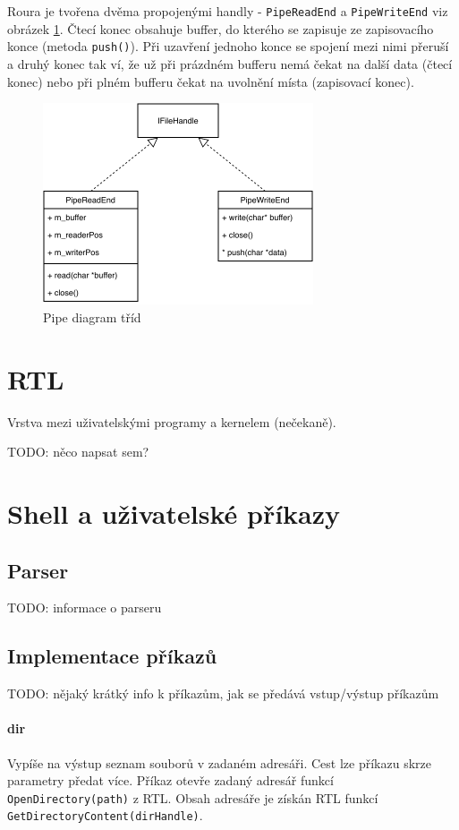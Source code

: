\documentclass[11pt,a4paper]{scrartcl}
\begin{document}
	Roura je tvořena dvěma propojenými handly - \verb|PipeReadEnd| a \verb|PipeWriteEnd| viz obrázek \ref{fig:pipe-c}. Čtecí konec obsahuje buffer, do kterého se zapisuje ze zapisovacího konce (metoda \verb|push()|). Při uzavření jednoho konce se spojení mezi nimi přeruší a druhý konec tak ví, že už při prázdném bufferu nemá čekat na další data (čtecí konec) nebo při plném bufferu čekat na uvolnění místa (zapisovací konec).
	
	\begin{figure}[H]
		\centering
		\includegraphics[width=8cm]{pipe-c.pdf}
		\caption{Pipe diagram tříd}
		\label{fig:pipe-c}
	\end{figure}
	
	\section{RTL}
	Vrstva mezi uživatelskými programy a kernelem (nečekaně).
	
	TODO: něco napsat sem?
	
	\section{Shell a uživatelské příkazy}
	
	\subsection{Parser}
	TODO: informace o parseru
	
	\subsection{Implementace příkazů}
	TODO: nějaký krátký info k příkazům, jak se předává vstup/výstup příkazům
	
	\paragraph{dir}
	Vypíše na výstup seznam souborů v zadaném adresáři. Cest lze příkazu skrze parametry předat více. Příkaz otevře zadaný adresář funkcí \verb|OpenDirectory(path)| z RTL. Obsah adresáře je získán RTL funkcí \verb|GetDirectoryContent(dirHandle)|.
	
\end{document}
